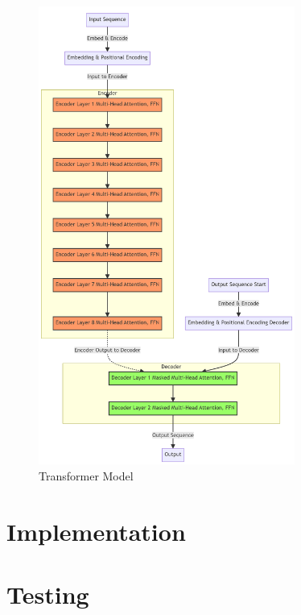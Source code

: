 \documentclass[preprint,11pt,review,authoryear]{elsarticle}
\begin{document}
\begin{figure}
    \centering
    \includegraphics[width=0.75\textwidth]{images/transformer.png}
    \caption{Transformer Model}
    \label{fig:transformer_model}
\end{figure}
\newpage
\section{Implementation} \label{G}
\renewcommand{\thepage}{G\arabic{page}}


\section{Testing} \label{H}
\renewcommand{\thepage}{H\arabic{page}}
\end{document}
